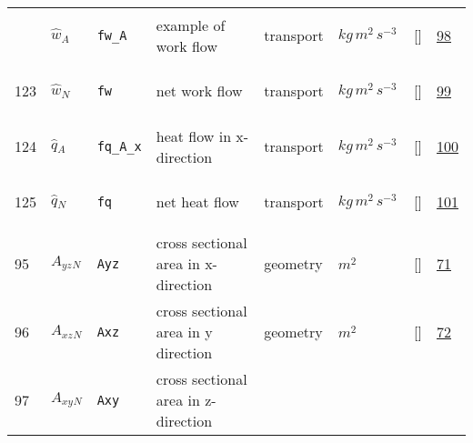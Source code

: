 \begin{longtable}{|p{1cm}|p{3cm}|p{3cm}|p{7cm}|p{3.0cm}|p{3cm}|p{2cm}|p{1cm}|}
             & \hypertarget{"v:122"}{ $ {\hat{w}}{_{A}} $}
             & \verb|fw_A|
             & example of work flow
             & \begin{lay}transport \end{lay}
             & $ kg \,m^{2} \,s^{-3} \, $
             & []
             & \hyperlink{"e:98"}{ 98 }
                 \\
    123
             & \hypertarget{"v:123"}{ $ {\hat{w}}{_{N}} $}
             & \verb|fw|
             & net work flow
             & \begin{lay}transport \end{lay}
             & $ kg \,m^{2} \,s^{-3} \, $
             & []
             & \hyperlink{"e:99"}{ 99 }
                 \\
    124
             & \hypertarget{"v:124"}{ $ {\hat{q}}{_{A}} $}
             & \verb|fq_A_x|
             & heat flow in x-direction
             & \begin{lay}transport \end{lay}
             & $ kg \,m^{2} \,s^{-3} \, $
             & []
             & \hyperlink{"e:100"}{ 100 }
                 \\
    125
             & \hypertarget{"v:125"}{ $ {\hat{q}}{_{N}} $}
             & \verb|fq|
             & net heat flow
             & \begin{lay}transport \end{lay}
             & $ kg \,m^{2} \,s^{-3} \, $
             & []
             & \hyperlink{"e:101"}{ 101 }
                 \\
    95
             & \hypertarget{"v:95"}{ $ {A_{yz}}{_{N}} $}
             & \verb|Ayz|
             & cross sectional area in x-direction
             & \begin{lay}geometry \end{lay}
             & $ m^{2} \, $
             & []
             & \hyperlink{"e:71"}{ 71 }
                 \\
    96
             & \hypertarget{"v:96"}{ $ {A_{xz}}{_{N}} $}
             & \verb|Axz|
             & cross sectional area in y direction
             & \begin{lay}geometry \end{lay}
             & $ m^{2} \, $
             & []
             & \hyperlink{"e:72"}{ 72 }
                 \\
    97
             & \hypertarget{"v:97"}{ $ {A_{xy}}{_{N}} $}
             & \verb|Axy|
             & cross sectional area in z-direction

\end{longtable}
